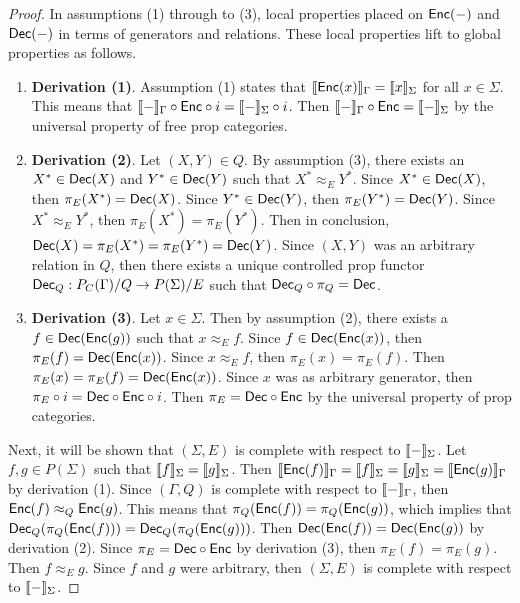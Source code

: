 \begin{proof}
    In assumptions (1) through to (3), local properties placed on $\mathsf{Enc}( - )$ and $\mathsf{Dec}( - )$ in terms of generators and relations.
    These local properties lift to global properties as follows.
    \begin{enumerate}
    \item \textbf{Derivation (1)}.
          Assumption (1) states that $\llbracket\mathsf{Enc}(x)\rrbracket_\Gamma = \llbracket x\rrbracket_\Sigma$ for all $x \in \Sigma$.
          This means that $\llbracket-\rrbracket_\Gamma \circ \mathsf{Enc} \circ i = \llbracket-\rrbracket_\Sigma \circ i$.
          Then $\llbracket-\rrbracket_\Gamma \circ \mathsf{Enc} = \llbracket-\rrbracket_\Sigma$ by the universal property of free prop categories.
    \item \textbf{Derivation (2)}.
          Let $( X, Y ) \in Q$.
          By assumption (3), there exists an $X^* \in \mathsf{Dec}( X )$ and $Y^* \in \mathsf{Dec}( Y )$ such that $X^* \approx_E Y^*$.
          Since $X^* \in \mathsf{Dec}( X )$, then $\pi_E( X^* ) = \mathsf{Dec}( X )$.
          Since $Y^* \in \mathsf{Dec}( Y )$, then $\pi_E( Y^* ) = \mathsf{Dec}( Y )$.
          Since $X^* \approx_E Y^*$, then $\pi_E( X^* ) = \pi_E( Y^* )$.
          Then in conclusion, $\mathsf{Dec}( X ) = \pi_E( X^* ) = \pi_E( Y^* ) = \mathsf{Dec}( Y )$.
          Since $( X, Y )$ was an arbitrary relation in $Q$, then there exists a unique controlled prop functor $\mathsf{Dec}_Q: P_C( \Gamma ) / Q \to P( \Sigma ) / E$ such that $\mathsf{Dec}_Q \circ \pi_Q = \mathsf{Dec}$.
    \item \textbf{Derivation (3)}.
          Let $x \in \Sigma$.
          Then by assumption (2), there exists a $f \in \mathsf{Dec}( \mathsf{Enc}( g ) )$ such that $x \approx_E f$.
          Since $f \in \mathsf{Dec}( \mathsf{Enc}( x ) )$, then $\pi_E( f ) = \mathsf{Dec}( \mathsf{Enc}( x ) )$.
          Since $x \approx_E f$, then $\pi_E( x ) = \pi_E( f )$.
          Then $\pi_E( x ) = \pi_E( f ) = \mathsf{Dec}( \mathsf{Enc}( x ) )$.
          Since $x$ was as arbitrary generator, then $\pi_E \circ i = \mathsf{Dec} \circ \mathsf{Enc} \circ i$.
          Then $\pi_E = \mathsf{Dec} \circ \mathsf{Enc}$ by the universal property of prop categories.
    \end{enumerate}
     Next, it will be shown that $( \Sigma, E )$ is complete with respect to $\llbracket-\rrbracket_\Sigma$.
     Let $f, g \in P( \Sigma )$ such that $\llbracket f\rrbracket_\Sigma = \llbracket g\rrbracket_\Sigma$.
     Then $\llbracket\mathsf{Enc}(f)\rrbracket_\Gamma = \llbracket f\rrbracket_\Sigma = \llbracket g\rrbracket_\Sigma = \llbracket\mathsf{Enc}(g)\rrbracket_\Gamma$ by derivation (1).
     Since $( \Gamma, Q )$ is complete with respect to $\llbracket-\rrbracket_\Gamma$, then $\mathsf{Enc}( f ) \approx_Q \mathsf{Enc}( g )$.
     This means that $\pi_Q( \mathsf{Enc}( f ) ) = \pi_Q( \mathsf{Enc}( g ) )$, which implies that $\mathsf{Dec}_Q( \pi_Q( \mathsf{Enc}( f ) ) ) = \mathsf{Dec}_Q( \pi_Q( \mathsf{Enc}( g ) ) )$.
     Then $\mathsf{Dec}( \mathsf{Enc}( f ) ) = \mathsf{Dec}( \mathsf{Enc}( g ) )$ by derivation (2).
     Since $\pi_E = \mathsf{Dec} \circ \mathsf{Enc}$ by derivation (3), then $\pi_E( f ) = \pi_E( g )$.
     Then $f \approx_E g$.
     Since $f$ and $g$ were arbitrary, then $( \Sigma, E )$ is complete with respect to $\llbracket-\rrbracket_\Sigma$.
\end{proof}
